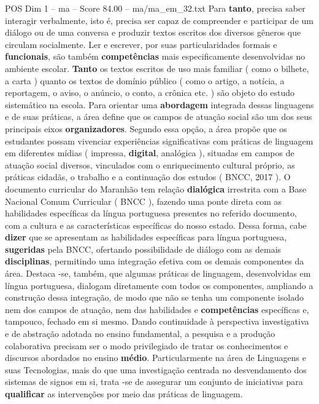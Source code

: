 \begin{textsample}{POS Dim 1 – ma – Score 84.00 – ma/ma\_em\_32.txt}
Para \textbf{tanto}, precisa saber interagir verbalmente, isto é, precisa ser capaz de compreender e participar de um diálogo ou de uma conversa e produzir textos escritos dos diversos gêneros que circulam socialmente.
Ler e escrever, por suas particularidades formais e \textbf{funcionais}, são também \textbf{competências} mais especificamente desenvolvidas no ambiente escolar. \textbf{Tanto} os textos escritos de uso mais familiar ( como o bilhete, a carta ) quanto os textos de domínio público ( como o artigo, a notícia, a reportagem, o aviso, o anúncio, o conto, a crônica etc. ) são objeto do estudo sistemático na escola.
Para orientar uma \textbf{abordagem} integrada dessas linguagens e de suas práticas, a área define que os campos de atuação social são um dos seus principais eixos \textbf{organizadores}.
Segundo essa opção, a área propõe que os estudantes possam vivenciar experiências significativas com práticas de linguagem em diferentes mídias ( impressa, \textbf{digital}, analógica ), situadas em campos de atuação social diversos, vinculados com o enriquecimento cultural próprio, as práticas cidadãs, o trabalho e a continuação dos estudos ( BNCC, 2017 ).
O documento curricular do Maranhão tem relação \textbf{dialógica} irrestrita com a Base Nacional Comum Curricular ( BNCC ), fazendo uma ponte direta com as habilidades específicas da língua portuguesa presentes no referido documento, com a cultura e as características específicas do nosso estado.
Dessa forma, cabe \textbf{dizer} que se apresentam as habilidades específicas para língua portuguesa, \textbf{sugeridas} pela BNCC, ofertando possibilidade de diálogo com as demais \textbf{disciplinas}, permitindo uma integração efetiva com os demais componentes da área.
Destaca -se, também, que algumas práticas de linguagem, desenvolvidas em língua portuguesa, dialogam diretamente com todos os componentes, ampliando a construção dessa integração, de modo que não se tenha um componente isolado nem dos campos de atuação, nem das habilidades e \textbf{competências} específicas e, tampouco, fechado em si mesmo.
Dando continuidade à perspectiva investigativa e de abstração adotada no ensino fundamental, a pesquisa e a produção colaborativa precisam ser o modo privilegiado de tratar os conhecimentos e discursos abordados no ensino \textbf{médio}.
Particularmente na área de Linguagens e suas Tecnologias, mais do que uma investigação centrada no desvendamento dos sistemas de signos em si, trata -se de assegurar um conjunto de iniciativas para \textbf{qualificar} as intervenções por meio das práticas de linguagem.

\end{textsample}

